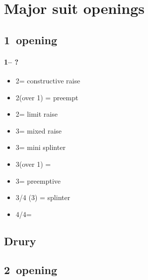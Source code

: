 \documentclass[12pt, a4paper]{report}
\begin{document}
{{    }

    \chapter*{\colorbox{Plum!30}{Major suit openings}}
     {

    }

    \section*{\colorbox{blue!30}{1\major\ opening}}
     {
        \subsubsection*{1\major -- ?}
        \begin{itemize}
            \item 2\major = constructive raise
            \item 2\spades (over 1\hearts) = preempt
            \item 2\nt = limit raise
            \item 3\clubs = mixed raise
            \item 3\diams = mini splinter
            \item 3\hearts (over 1\spades) = \nat\ \inv
            \item 3\major = preemptive
            \item 3\nt/4 (3\spades) = splinter
            \item 4\diams/4\hearts = \major
        \end{itemize}
    }

    \section*{\colorbox{blue!30}{Drury}}
     {

    }

    \section*{\colorbox{blue!30}{2\hearts\ opening}}
     {

}}
\end{document}
